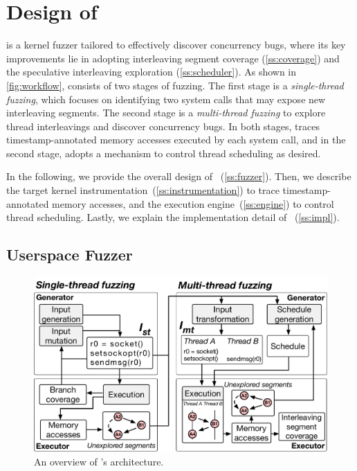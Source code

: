 \section{Design of \sys}
\label{s:impl}

\sys is a kernel fuzzer tailored to effectively discover concurrency
bugs, where its key improvements lie in adopting interleaving segment
coverage (\autoref{ss:coverage}) and the speculative interleaving
exploration (\autoref{ss:scheduler}).
%
As shown in \autoref{fig:workflow}, \sys consists of two stages of
fuzzing.
%
The first stage is a \textit{single-thread fuzzing}, which focuses on
identifying two system calls that may expose new interleaving
segments.
%
The second stage is a \textit{multi-thread fuzzing} to explore thread
interleavings and discover concurrency bugs.
%
In both stages, \sys traces timestamp-annotated memory accesses
executed by each system call, and in the second stage, \sys adopts a
mechanism to control thread scheduling as desired.



In the following, we provide the overall design of
\sys~(\autoref{ss:fuzzer}).
%
Then, we describe the target kernel
instrumentation~(\autoref{ss:instrumentation}) to trace
timestamp-annotated memory accesses, and the execution
engine~(\autoref{ss:engine}) to control thread scheduling.
%
Lastly, we explain the implementation detail of
\sys~(\autoref{ss:impl}).




\subsection{Userspace Fuzzer}
\label{ss:fuzzer}

\begin{figure}
  \centering
  \includegraphics[width=\linewidth]{fig/architecture.pdf}
  \caption{An overview of \sys's architecture.}
  \label{fig:workflow}
\end{figure}


